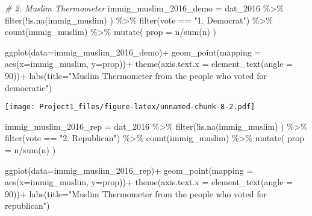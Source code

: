\documentclass[
]{article}
\newenvironment{Shaded}{\begin{snugshade}}{\end{snugshade}}
\newcommand{\AttributeTok}[1]{\textcolor[rgb]{0.77,0.63,0.00}{#1}}
\newcommand{\CommentTok}[1]{\textcolor[rgb]{0.56,0.35,0.01}{\textit{#1}}}
\newcommand{\DecValTok}[1]{\textcolor[rgb]{0.00,0.00,0.81}{#1}}
\newcommand{\FunctionTok}[1]{\textcolor[rgb]{0.00,0.00,0.00}{#1}}
\newcommand{\NormalTok}[1]{#1}
\newcommand{\OtherTok}[1]{\textcolor[rgb]{0.56,0.35,0.01}{#1}}
\newcommand{\SpecialCharTok}[1]{\textcolor[rgb]{0.00,0.00,0.00}{#1}}
\newcommand{\StringTok}[1]{\textcolor[rgb]{0.31,0.60,0.02}{#1}}
\begin{document}
\begin{Shaded}
\begin{Highlighting}[]
\CommentTok{\# 2. Muslim Thermometer}
\NormalTok{immig\_muslim\_2016\_demo }\OtherTok{=}\NormalTok{ dat\_2016 }\SpecialCharTok{\%\textgreater{}\%}
  \FunctionTok{filter}\NormalTok{(}\SpecialCharTok{!}\FunctionTok{is.na}\NormalTok{(immig\_muslim) ) }\SpecialCharTok{\%\textgreater{}\%}
  \FunctionTok{filter}\NormalTok{(vote }\SpecialCharTok{==} \StringTok{"1. Democrat"}\NormalTok{) }\SpecialCharTok{\%\textgreater{}\%}
  \FunctionTok{count}\NormalTok{(immig\_muslim) }\SpecialCharTok{\%\textgreater{}\%}
  \FunctionTok{mutate}\NormalTok{(}
    \AttributeTok{prop =}\NormalTok{ n}\SpecialCharTok{/}\FunctionTok{sum}\NormalTok{(n)}
\NormalTok{  )}
  
\FunctionTok{ggplot}\NormalTok{(}\AttributeTok{data=}\NormalTok{immig\_muslim\_2016\_demo)}\SpecialCharTok{+}
\FunctionTok{geom\_point}\NormalTok{(}\AttributeTok{mapping =} \FunctionTok{aes}\NormalTok{(}\AttributeTok{x=}\NormalTok{immig\_muslim, }\AttributeTok{y=}\NormalTok{prop))}\SpecialCharTok{+}
\FunctionTok{theme}\NormalTok{(}\AttributeTok{axis.text.x =} \FunctionTok{element\_text}\NormalTok{(}\AttributeTok{angle =} \DecValTok{90}\NormalTok{))}\SpecialCharTok{+}
  \FunctionTok{labs}\NormalTok{(}\AttributeTok{title=}\StringTok{"Muslim Thermometer from the people who voted for democratic"}\NormalTok{)}
\end{Highlighting}
\end{Shaded}

\texttt{[image: Project1\_files/figure-latex/unnamed-chunk-8-2.pdf]}

\begin{Shaded}
\begin{Highlighting}[]
\NormalTok{immig\_muslim\_2016\_rep }\OtherTok{=}\NormalTok{ dat\_2016 }\SpecialCharTok{\%\textgreater{}\%}
  \FunctionTok{filter}\NormalTok{(}\SpecialCharTok{!}\FunctionTok{is.na}\NormalTok{(immig\_muslim) ) }\SpecialCharTok{\%\textgreater{}\%}
  \FunctionTok{filter}\NormalTok{(vote }\SpecialCharTok{==} \StringTok{"2. Republican"}\NormalTok{) }\SpecialCharTok{\%\textgreater{}\%}
  \FunctionTok{count}\NormalTok{(immig\_muslim) }\SpecialCharTok{\%\textgreater{}\%}
  \FunctionTok{mutate}\NormalTok{(}
    \AttributeTok{prop =}\NormalTok{ n}\SpecialCharTok{/}\FunctionTok{sum}\NormalTok{(n)}
\NormalTok{  )}

\FunctionTok{ggplot}\NormalTok{(}\AttributeTok{data=}\NormalTok{immig\_muslim\_2016\_rep)}\SpecialCharTok{+}
\FunctionTok{geom\_point}\NormalTok{(}\AttributeTok{mapping =} \FunctionTok{aes}\NormalTok{(}\AttributeTok{x=}\NormalTok{immig\_muslim, }\AttributeTok{y=}\NormalTok{prop))}\SpecialCharTok{+}
\FunctionTok{theme}\NormalTok{(}\AttributeTok{axis.text.x =} \FunctionTok{element\_text}\NormalTok{(}\AttributeTok{angle =} \DecValTok{90}\NormalTok{))}\SpecialCharTok{+}
  \FunctionTok{labs}\NormalTok{(}\AttributeTok{title=}\StringTok{"Muslim Thermometer from the people who voted for republican"}\NormalTok{)}
\end{Highlighting}
\end{Shaded}
\end{document}
